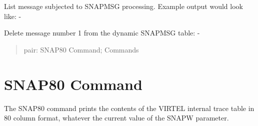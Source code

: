 \documentclass[letterpaper,10pt,english]{sphinxmanual}
\begin{document}
List message subjected to SNAPMSG processing. Example output would look like: -

\begin{sphinxVerbatim}[commandchars=\\\{\}]
 
        
  
  
   
\end{sphinxVerbatim}

Delete message number 1 from the dynamic SNAPMSG table: -

\begin{sphinxVerbatim}[commandchars=\\\{\}]
 
\end{sphinxVerbatim}

\begin{sphinxVerbatim}[commandchars=\\\{\}]
 
\end{sphinxVerbatim}
\begin{quote}

pair: SNAP80 Command; Commands
\end{quote}


\section{SNAP80 Command}
\label{\detokenize{audit_operations_ and_performance:snap80-command}}
\begin{sphinxVerbatim}[commandchars=\\\{\}]
\end{sphinxVerbatim}

The SNAP80 command prints the contents of the VIRTEL internal trace table in 80 column format, whatever the current value of the SNAPW parameter.

\ignorespaces 
\end{document}
